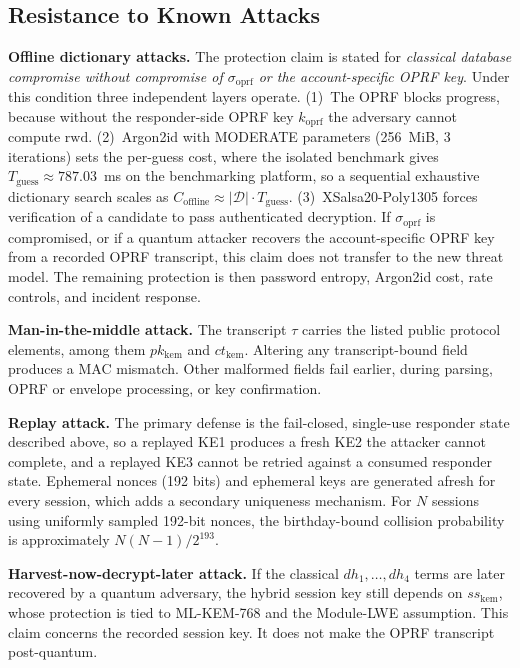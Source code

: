 \documentclass{ieeeijc}
\newcommand{\sigoprf}{\sigma_{\mathrm{oprf}}}
\theoremstyle{remark}
\begin{document}
\subsection{Resistance to Known Attacks}

\textbf{Offline dictionary attacks.} The protection claim is stated for \emph{classical database compromise without compromise of $\sigoprf$ or the account-specific OPRF key}. Under this condition three independent layers operate. (1)~The OPRF blocks progress, because without the responder-side OPRF key $k_{\mathrm{oprf}}$ the adversary cannot compute $\mathrm{rwd}$. (2)~Argon2id with MODERATE parameters (256~MiB, 3 iterations) sets the per-guess cost, where the isolated benchmark gives $T_{\mathrm{guess}} \approx 787.03$~ms on the benchmarking platform, so a sequential exhaustive dictionary search scales as $C_{\mathrm{offline}} \approx |\mathcal{D}| \cdot T_{\mathrm{guess}}$. (3)~XSalsa20-Poly1305 forces verification of a candidate to pass authenticated decryption. If $\sigoprf$ is compromised, or if a quantum attacker recovers the account-specific OPRF key from a recorded OPRF transcript, this claim does not transfer to the new threat model. The remaining protection is then password entropy, Argon2id cost, rate controls, and incident response.

\textbf{Man-in-the-middle attack.} The transcript $\tau$ carries the listed public protocol elements, among them $pk_{\mathrm{kem}}$ and $ct_{\mathrm{kem}}$. Altering any transcript-bound field produces a MAC mismatch. Other malformed fields fail earlier, during parsing, OPRF or envelope processing, or key confirmation.

\textbf{Replay attack.} The primary defense is the fail-closed, single-use
responder state described above, so a replayed KE1 produces a fresh KE2 the
attacker cannot complete, and a replayed KE3 cannot be retried against a
consumed responder state. Ephemeral nonces (192 bits) and ephemeral keys are
generated afresh for every session, which adds a secondary uniqueness mechanism.
For $N$ sessions using uniformly sampled 192-bit nonces, the birthday-bound
collision probability is approximately $N(N-1)/2^{193}$.

\textbf{Harvest-now-decrypt-later attack.} If the classical
$dh_1,\ldots,dh_4$ terms are later recovered by a quantum adversary, the
hybrid session key still depends on $ss_{\mathrm{kem}}$, whose protection is
tied to ML-KEM-768 and the Module-LWE assumption. This claim concerns the
recorded session key. It does not make the OPRF transcript post-quantum.
\end{document}
